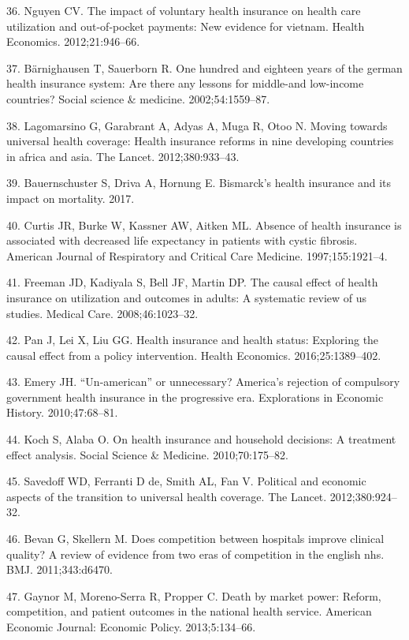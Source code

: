 \documentclass[]{elsarticle} %
\begin{document}
\leavevmode\hypertarget{ref-Nguyen2012}{}%
36. Nguyen CV. The impact of voluntary health insurance on health care utilization and out‐of‐pocket payments: New evidence for vietnam. Health Economics. 2012;21:946--66.

\leavevmode\hypertarget{ref-barnighausen2002one}{}%
37. Bärnighausen T, Sauerborn R. One hundred and eighteen years of the german health insurance system: Are there any lessons for middle-and low-income countries? Social science \& medicine. 2002;54:1559--87.

\leavevmode\hypertarget{ref-lagomarsino2012moving}{}%
38. Lagomarsino G, Garabrant A, Adyas A, Muga R, Otoo N. Moving towards universal health coverage: Health insurance reforms in nine developing countries in africa and asia. The Lancet. 2012;380:933--43.

\leavevmode\hypertarget{ref-bauernschuster2017bismarck}{}%
39. Bauernschuster S, Driva A, Hornung E. Bismarck's health insurance and its impact on mortality. 2017.

\leavevmode\hypertarget{ref-Curtis1997}{}%
40. Curtis JR, Burke W, Kassner AW, Aitken ML. Absence of health insurance is associated with decreased life expectancy in patients with cystic fibrosis. American Journal of Respiratory and Critical Care Medicine. 1997;155:1921--4.

\leavevmode\hypertarget{ref-Freeman2008}{}%
41. Freeman JD, Kadiyala S, Bell JF, Martin DP. The causal effect of health insurance on utilization and outcomes in adults: A systematic review of us studies. Medical Care. 2008;46:1023--32.

\leavevmode\hypertarget{ref-Pan2016}{}%
42. Pan J, Lei X, Liu GG. Health insurance and health status: Exploring the causal effect from a policy intervention. Health Economics. 2016;25:1389--402.

\leavevmode\hypertarget{ref-Emery2010}{}%
43. Emery JH. ``Un-american'' or unnecessary? America's rejection of compulsory government health insurance in the progressive era. Explorations in Economic History. 2010;47:68--81.

\leavevmode\hypertarget{ref-koch2010health}{}%
44. Koch S, Alaba O. On health insurance and household decisions: A treatment effect analysis. Social Science \& Medicine. 2010;70:175--82.

\leavevmode\hypertarget{ref-savedoff2012political}{}%
45. Savedoff WD, Ferranti D de, Smith AL, Fan V. Political and economic aspects of the transition to universal health coverage. The Lancet. 2012;380:924--32.

\leavevmode\hypertarget{ref-bevan2011does}{}%
46. Bevan G, Skellern M. Does competition between hospitals improve clinical quality? A review of evidence from two eras of competition in the english nhs. BMJ. 2011;343:d6470.

\leavevmode\hypertarget{ref-gaynor2013death}{}%
47. Gaynor M, Moreno-Serra R, Propper C. Death by market power: Reform, competition, and patient outcomes in the national health service. American Economic Journal: Economic Policy. 2013;5:134--66.
\end{document}
